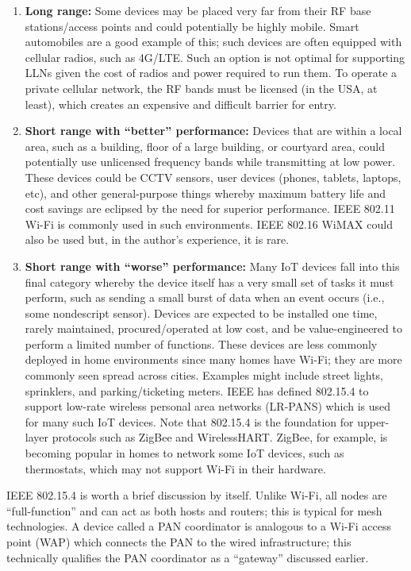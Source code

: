 \begin{enumerate}
  \begin{enumerate}
    \item \textbf{Long range:} Some devices may be placed very far from their RF base
	stations/access points and could potentially be highly mobile. Smart
	automobiles are a good example of this; such devices are often equipped with
	cellular radios, such as 4G/LTE\@. Such an option is not optimal for supporting
	LLNs given the cost of radios and power required to run them. To operate a
	private cellular network, the RF bands must be licensed (in the USA, at
	least), which creates an expensive and difficult barrier for entry.
    \item \textbf{Short range with ``better'' performance:} Devices that are within a
	local area, such as a building, floor of a large building, or courtyard area,
	could potentially use unlicensed frequency bands while transmitting at low
	power. These devices could be CCTV sensors, user devices (phones, tablets,
	laptops, etc), and other general-purpose things whereby maximum battery life
	and cost savings are eclipsed by the need for superior performance. IEEE
	802.11 Wi-Fi is commonly used in such environments. IEEE 802.16 WiMAX could
	also be used but, in the author’s experience, it is rare.
    \item \textbf{Short range with ``worse'' performance:} Many IoT devices
	fall into this final category whereby the device itself has a very small set
	of tasks it must perform, such as sending a small burst of data when an event
	occurs (i.e., some nondescript sensor). Devices are expected to be installed
	one time, rarely maintained, procured/operated at low cost, and be
	value-engineered to perform a limited number of functions. These devices are
	less commonly deployed in home environments since many homes have Wi-Fi; they
	are more commonly seen spread across cities. Examples might include street
	lights, sprinklers, and parking/ticketing meters. IEEE has defined 802.15.4
	to support low-rate wireless personal area networks (LR-PANS) which is used
	for many such IoT devices. Note that 802.15.4 is the foundation for
	upper-layer protocols such as ZigBee and WirelessHART\@. ZigBee, for example,
	is becoming popular in homes to network some IoT devices, such as
	thermostats, which may not support Wi-Fi in their hardware.
  \end{enumerate}
\end{enumerate}

IEEE 802.15.4 is worth a brief discussion by itself. Unlike Wi-Fi, all nodes
are ``full-function'' and can act as both hosts and routers; this is typical
for mesh technologies. A device called a PAN coordinator is analogous to a
Wi-Fi access point (WAP) which connects the PAN to the wired infrastructure;
this technically qualifies the PAN coordinator as a ``gateway'' discussed earlier.

